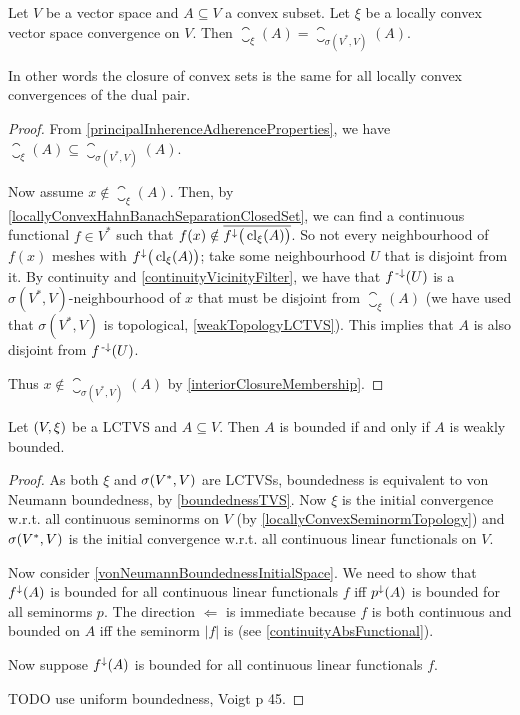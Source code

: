 \begin{proposition} \label{weakClosureConvexSubsets}
Let $V$ be a vector space and $A\subseteq V$ a convex subset. Let $\xi$ be a locally convex vector space convergence on $V$. Then $\closure_\xi(A) = \closure_{\sigma(V^*, V)}(A)$.
\end{proposition}
In other words the closure of convex sets is the same for all locally convex convergences of the dual pair.
\begin{proof}
From \ref{principalInherenceAdherenceProperties}, we have $\closure_\xi(A) \subseteq \closure_{\sigma(V^*, V)}(A)$.

Now assume $x\notin \closure_\xi(A)$. Then, by \ref{locallyConvexHahnBanachSeparationClosedSet}, we can find a continuous functional $f\in V^*$ such that $f(x) \notin \overline{f^{\downarrow}\big(\operatorname{cl}_\xi(A)\big)}$. So not every neighbourhood of $f(x)$ meshes with $f^{\downarrow}\big(\operatorname{cl}_\xi(A)\big)$; take some neighbourhood $U$ that is disjoint from it. By continuity and \ref{continuityVicinityFilter}, we have that $f^{{\text{\hspace{0.15em}-}\downarrow}}(U)$ is a $\sigma(V^*, V)$-neighbourhood of $x$ that must be disjoint from $\closure_\xi(A)$ (we have used that $\sigma(V^*, V)$ is topological, \ref{weakTopologyLCTVS}). This implies that $A$ is also disjoint from $f^{{\text{\hspace{0.15em}-}\downarrow}}(U)$.

Thus $x\notin \closure_{\sigma(V^*, V)}(A)$ by \ref{interiorClosureMembership}.
\end{proof}

\begin{proposition} \label{weaklyBoundedIffBounded}
Let $\sSet{V,\xi}$ be a LCTVS and $A\subseteq V$. Then $A$ is bounded \textup{if and only if} $A$ is weakly bounded.
\end{proposition}
\begin{proof}
As both $\xi$ and $\sigma({V}^*, V)$ are LCTVSs, boundedness is equivalent to von Neumann boundedness, by \ref{boundednessTVS}. Now $\xi$ is the initial convergence w.r.t. all continuous seminorms on $V$ (by \ref{locallyConvexSeminormTopology}) and $\sigma({V}^*, V)$ is the initial convergence w.r.t. all continuous linear functionals on $V$.

Now consider \ref{vonNeumannBoundednessInitialSpace}. We need to show that $f^\downarrow(A)$ is bounded for all continuous linear functionals $f$ iff $p^\downarrow(A)$ is bounded for all seminorms $p$. The direction $\Leftarrow$ is immediate because $f$ is both continuous and bounded on $A$ iff the seminorm $|f|$ is (see \ref{continuityAbsFunctional}).

Now suppose $f^\downarrow(A)$ is bounded for all continuous linear functionals $f$. 

TODO use uniform boundedness, Voigt p 45.
\end{proof}


